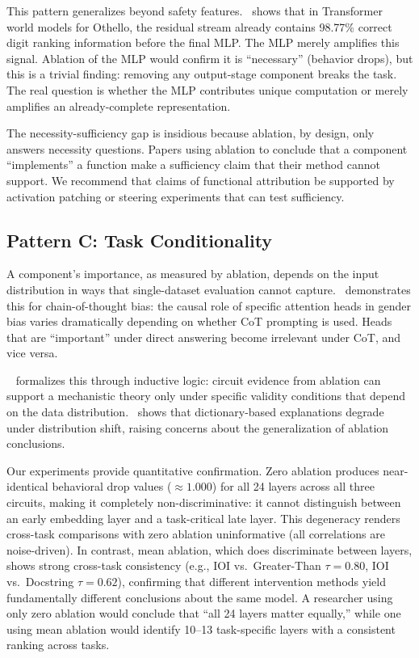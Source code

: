 \documentclass[pdflatex,sn-mathphys-num]{sn-jnl}
\begin{document}
This pattern generalizes beyond safety features.~\cite{KniazevFijalkow2026} shows that in Transformer world models for Othello, the residual stream already contains 98.77\% correct digit ranking information before the final MLP. The MLP merely amplifies this signal. Ablation of the MLP would confirm it is ``necessary'' (behavior drops), but this is a trivial finding: removing any output-stage component breaks the task. The real question is whether the MLP contributes unique computation or merely amplifies an already-complete representation.

The necessity-sufficiency gap is insidious because ablation, by design, only answers necessity questions. Papers using ablation to conclude that a component ``implements'' a function make a sufficiency claim that their method cannot support. We recommend that claims of functional attribution be supported by activation patching or steering experiments that can test sufficiency.

\subsection{Pattern C: Task Conditionality}
\label{sec:patternC}

A component's importance, as measured by ablation, depends on the input distribution in ways that single-dataset evaluation cannot capture.~\cite{Pearman2026} demonstrates this for chain-of-thought bias: the causal role of specific attention heads in gender bias varies dramatically depending on whether CoT prompting is used. Heads that are ``important'' under direct answering become irrelevant under CoT, and vice versa.

~\cite{Aljaafari2026} formalizes this through inductive logic: circuit evidence from ablation can support a mechanistic theory only under specific validity conditions that depend on the data distribution.~\cite{Lima2026} shows that dictionary-based explanations degrade under distribution shift, raising concerns about the generalization of ablation conclusions.

Our experiments provide quantitative confirmation. Zero ablation produces near-identical behavioral drop values ($\approx 1.000$) for all 24 layers across all three circuits, making it completely non-discriminative: it cannot distinguish between an early embedding layer and a task-critical late layer. This degeneracy renders cross-task comparisons with zero ablation uninformative (all correlations are noise-driven). In contrast, mean ablation, which does discriminate between layers, shows strong cross-task consistency (e.g., IOI vs.\ Greater-Than $\tau = 0.80$, IOI vs.\ Docstring $\tau = 0.62$), confirming that different intervention methods yield fundamentally different conclusions about the same model. A researcher using only zero ablation would conclude that ``all 24 layers matter equally,'' while one using mean ablation would identify 10--13 task-specific layers with a consistent ranking across tasks.
\end{document}
